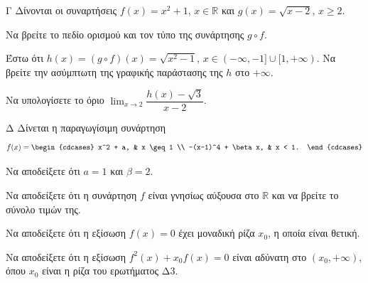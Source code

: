 \begin{thema}{Γ}
Δίνονται οι συναρτήσεις $f(x) = x^2 + 1$, $x \in \mathbb{R}$ και $g(x) = \sqrt{x-2}$, $x \geq 2$.
\begin{erwthma}
    \item Να βρείτε το πεδίο ορισμού και τον τύπο της συνάρτησης $g \circ f$. 
    \item Έστω ότι $h(x) = (g \circ f)(x) = \sqrt{x^2 - 1}$, $x \in (-\infty, -1] \cup [1, +\infty)$. Να βρείτε την ασύμπτωτη της γραφικής παράστασης της $h$ στο $+\infty$. 
    \item Να υπολογίσετε το όριο $\displaystyle\lim_{x \to 2} \dfrac{h(x) - \sqrt{3}}{x - 2}$. 
\end{erwthma}
\end{thema}
\begin{thema}{Δ}
Δίνεται η παραγωγίσιμη συνάρτηση
\[
f(x) = \begin{cdcases} x^2 + a, & x \geq 1 \\ -(x-1)^4 + \beta x, & x < 1. \end{cdcases}
\]
\begin{erwthma}
    \item Να αποδείξετε ότι $a = 1$ και $\beta = 2$. 
    \item Να αποδείξετε ότι η συνάρτηση $f$ είναι γνησίως αύξουσα στο $\mathbb{R}$ και να βρείτε το σύνολο τιμών της. 
    \item Να αποδείξετε ότι η εξίσωση $f(x) = 0$ έχει μοναδική ρίζα $x_0$, η οποία είναι θετική. 
    \item Να αποδείξετε ότι η εξίσωση $f^2(x) + x_0 f(x) = 0$ είναι αδύνατη στο $(x_0, +\infty)$, όπου $x_0$ είναι η ρίζα του ερωτήματος Δ3. 
\end{erwthma}
\end{thema}

